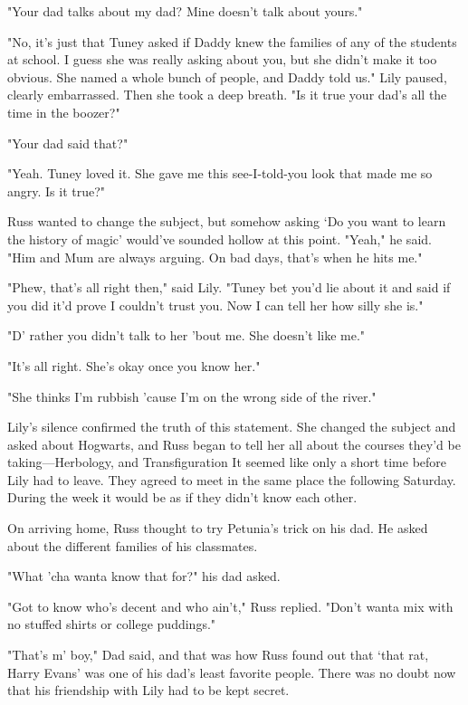 "Your dad{\el} talks about my dad? Mine doesn't talk{\el} about yours."

"No, it's just that Tuney asked if Daddy knew the families of any of the students at school. I guess she was really asking about you, but she didn't make it too obvious. She named a whole bunch of people, and Daddy told us." Lily paused, clearly embarrassed. Then she took a deep breath. "Is it true your dad's all the time in the boozer?"

"Your dad said{\el} that?"

"Yeah. Tuney loved it. She gave me this see-I-told-you look that made me so angry. Is it true?"

Russ wanted to change the subject, but somehow asking `Do you want to learn the history of magic' would've sounded hollow at this point. "Yeah," he said. "Him and Mum are always{\el} arguing. On bad{\el} days, that's when he{\el} hits me."

"Phew, that's all right then," said Lily. "Tuney bet you'd lie about it and said if you did it'd prove I couldn't trust you. Now I can tell her how silly she is."

"D' rather you didn't{\el} talk to her 'bout{\el} me. She doesn't like me."

"It's all right. She's okay once you know her."

"She thinks I'm{\el} rubbish 'cause I'm on the wrong side{\el} of the river."

Lily's silence confirmed the truth of this statement. She changed the subject and asked about Hogwarts, and Russ began to tell her all about the courses they'd be taking—Herbology, and Transfiguration{\el} It seemed like only a short time before Lily had to leave. They agreed to meet in the same place the following Saturday. During the week it would be as if they didn't know each other.

On arriving home, Russ thought to try Petunia's trick on his dad. He asked about the different families of his classmates.

"What 'cha wanta know that for?" his dad asked.

"Got to know who's decent and who ain't," Russ replied. "Don't wanta mix with no stuffed shirts or college puddings."

"That's m' boy," Dad said, and that was how Russ found out that `that rat, Harry Evans' was one of his dad's least favorite people. There was no doubt now that his friendship with Lily had to be kept secret.

